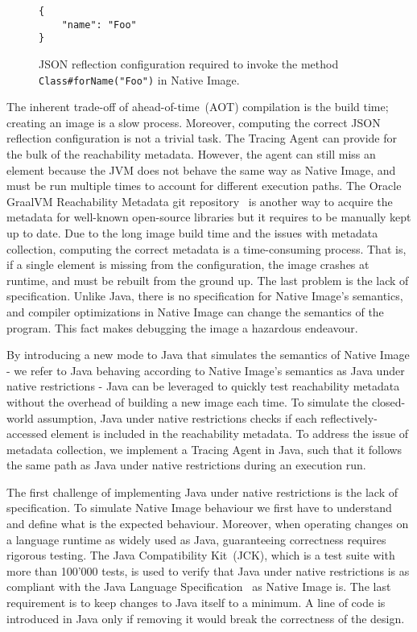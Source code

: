 \begin{figure}[ht]
    \centering
\begin{lstlisting}
{
    "name": "Foo"
}
\end{lstlisting}
    \caption{JSON reflection configuration required to invoke the method \texttt{Class\#forName("Foo")} in Native Image.}
    \label{fig:foo_metadata}
\end{figure}

The inherent trade-off of ahead-of-time~(AOT) compilation is the build time; creating an image is a slow process. Moreover, computing the correct JSON reflection configuration is not a trivial task.
The Tracing Agent can provide for the bulk of the reachability metadata. However, the agent can still miss an element because the JVM does not behave the same way as Native Image, and must be run multiple times to account for different execution paths. The Oracle GraalVM Reachability Metadata git repository~\cite{noauthor_oraclegraalvm-reachability-metadata_2024} is another way to acquire the metadata for well-known open-source libraries but it requires to be manually kept up to date. Due to the long image build time and the issues with metadata collection, computing the correct metadata is a time-consuming process. That is, if a single element is missing from the configuration, the image crashes at runtime, and must be rebuilt from the ground up.
The last problem is the lack of specification. Unlike Java, there is no specification for Native Image's semantics, and compiler optimizations in Native Image can change the semantics of the program. This fact makes debugging the image a hazardous endeavour.

By introducing a new mode to Java that simulates the semantics of Native Image - we refer to Java behaving according to Native Image's semantics as Java under native restrictions - Java can be leveraged to quickly test reachability metadata without the overhead of building a new image each time. 
To simulate the closed-world assumption, Java under native restrictions checks if each reflectively-accessed element is included in the reachability metadata. To address the issue of metadata collection, we implement a Tracing Agent in Java, such that it follows the same path as Java under native restrictions during an execution run.

The first challenge of implementing Java under native restrictions is the lack of specification. To simulate Native Image behaviour we first have to understand and define what is the expected behaviour. 
Moreover, when operating changes on a language runtime as widely used as Java, guaranteeing correctness requires rigorous testing. The Java Compatibility Kit~(JCK), which is a test suite with more than 100'000 tests, is used to verify that Java under native restrictions is as compliant with the Java Language Specification~\cite{noauthor_java_nodate-2} as Native Image is.
The last requirement is to keep changes to Java itself to a minimum. A line of code is introduced in Java only if removing it would break the correctness of the design.

